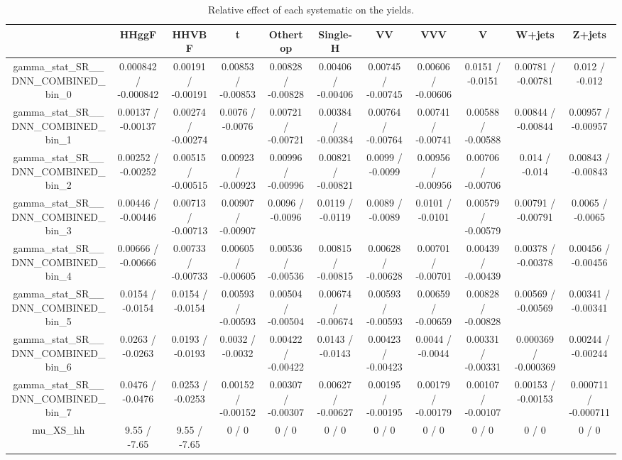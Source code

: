 \documentclass[10pt]{article}
\begin{document}
\begin{table}[htbp]
\begin{center}
\begin{tabular}{|c|c|c|c|c|c|c|c|c|c|c|}
\hline 
      & HHggF      & HHVBF      & t      & Othertop      & Single-H      & VV      & VVV      & V      & W+jets      & Z+jets \\ 
\hline 
  gamma_stat_SR__DNN_COMBINED_bin_0 & 0.000842 / -0.000842 & 0.00191 / -0.00191 & 0.00853 / -0.00853 & 0.00828 / -0.00828 & 0.00406 / -0.00406 & 0.00745 / -0.00745 & 0.00606 / -0.00606 & 0.0151 / -0.0151 & 0.00781 / -0.00781 & 0.012 / -0.012 \\ 
  gamma_stat_SR__DNN_COMBINED_bin_1 & 0.00137 / -0.00137 & 0.00274 / -0.00274 & 0.0076 / -0.0076 & 0.00721 / -0.00721 & 0.00384 / -0.00384 & 0.00764 / -0.00764 & 0.00741 / -0.00741 & 0.00588 / -0.00588 & 0.00844 / -0.00844 & 0.00957 / -0.00957 \\ 
  gamma_stat_SR__DNN_COMBINED_bin_2 & 0.00252 / -0.00252 & 0.00515 / -0.00515 & 0.00923 / -0.00923 & 0.00996 / -0.00996 & 0.00821 / -0.00821 & 0.0099 / -0.0099 & 0.00956 / -0.00956 & 0.00706 / -0.00706 & 0.014 / -0.014 & 0.00843 / -0.00843 \\ 
  gamma_stat_SR__DNN_COMBINED_bin_3 & 0.00446 / -0.00446 & 0.00713 / -0.00713 & 0.00907 / -0.00907 & 0.0096 / -0.0096 & 0.0119 / -0.0119 & 0.0089 / -0.0089 & 0.0101 / -0.0101 & 0.00579 / -0.00579 & 0.00791 / -0.00791 & 0.0065 / -0.0065 \\ 
  gamma_stat_SR__DNN_COMBINED_bin_4 & 0.00666 / -0.00666 & 0.00733 / -0.00733 & 0.00605 / -0.00605 & 0.00536 / -0.00536 & 0.00815 / -0.00815 & 0.00628 / -0.00628 & 0.00701 / -0.00701 & 0.00439 / -0.00439 & 0.00378 / -0.00378 & 0.00456 / -0.00456 \\ 
  gamma_stat_SR__DNN_COMBINED_bin_5 & 0.0154 / -0.0154 & 0.0154 / -0.0154 & 0.00593 / -0.00593 & 0.00504 / -0.00504 & 0.00674 / -0.00674 & 0.00593 / -0.00593 & 0.00659 / -0.00659 & 0.00828 / -0.00828 & 0.00569 / -0.00569 & 0.00341 / -0.00341 \\ 
  gamma_stat_SR__DNN_COMBINED_bin_6 & 0.0263 / -0.0263 & 0.0193 / -0.0193 & 0.0032 / -0.0032 & 0.00422 / -0.00422 & 0.0143 / -0.0143 & 0.00423 / -0.00423 & 0.0044 / -0.0044 & 0.00331 / -0.00331 & 0.000369 / -0.000369 & 0.00244 / -0.00244 \\ 
  gamma_stat_SR__DNN_COMBINED_bin_7 & 0.0476 / -0.0476 & 0.0253 / -0.0253 & 0.00152 / -0.00152 & 0.00307 / -0.00307 & 0.00627 / -0.00627 & 0.00195 / -0.00195 & 0.00179 / -0.00179 & 0.00107 / -0.00107 & 0.00153 / -0.00153 & 0.000711 / -0.000711 \\ 
  mu_XS_hh & 9.55 / -7.65 & 9.55 / -7.65 & 0 / 0 & 0 / 0 & 0 / 0 & 0 / 0 & 0 / 0 & 0 / 0 & 0 / 0 & 0 / 0 \\ 
\hline 
\end{tabular} 
\caption{Relative effect of each systematic on the yields.} 
\end{center} 
\end{table} 
\end{document}
